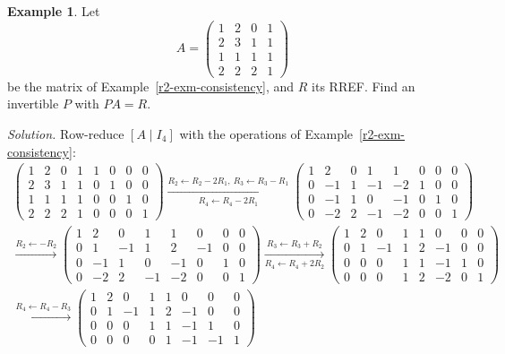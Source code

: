 \documentclass[12pt]{article}
\theoremstyle{definition}
\newtheorem{example}[theorem]{Example}
\begin{document}
\begin{example}\label{r2-exm-row-equivalent}
Let
\[
A=\begin{pmatrix}1&2&0&1\\2&3&1&1\\1&1&1&1\\2&2&2&1\end{pmatrix}
\]
be the matrix of Example~\ref{r2-exm-consistency}, and \(R\) its RREF. Find an invertible \(P\) with \(PA=R\).

\textit{Solution.} Row-reduce \([A\mid I_4]\) with the operations of Example~\ref{r2-exm-consistency}:
\[
\begin{gathered}
\left(\begin{array}{cccc|cccc}1&2&0&1&1&0&0&0\\2&3&1&1&0&1&0&0\\1&1&1&1&0&0&1&0\\2&2&2&1&0&0&0&1\end{array}\right)
\xrightarrow[R_4\leftarrow R_4-2R_1]{R_2\leftarrow R_2-2R_1,\ R_3\leftarrow R_3-R_1}
\left(\begin{array}{cccc|cccc}1&2&0&1&1&0&0&0\\0&-1&1&-1&-2&1&0&0\\0&-1&1&0&-1&0&1&0\\0&-2&2&-1&-2&0&0&1\end{array}\right)
\\
\xrightarrow{R_2\leftarrow-R_2}
\left(\begin{array}{cccc|cccc}1&2&0&1&1&0&0&0\\0&1&-1&1&2&-1&0&0\\0&-1&1&0&-1&0&1&0\\0&-2&2&-1&-2&0&0&1\end{array}\right)
\xrightarrow[R_4\leftarrow R_4+2R_2]{R_3\leftarrow R_3+R_2}
\left(\begin{array}{cccc|cccc}1&2&0&1&1&0&0&0\\0&1&-1&1&2&-1&0&0\\0&0&0&1&1&-1&1&0\\0&0&0&1&2&-2&0&1\end{array}\right)
\\
\xrightarrow{R_4\leftarrow R_4-R_3}
\left(\begin{array}{cccc|cccc}1&2&0&1&1&0&0&0\\0&1&-1&1&2&-1&0&0\\0&0&0&1&1&-1&1&0\\0&0&0&0&1&-1&-1&1\end{array}\right)

\end{gathered}\]
\end{example}
\end{document}
